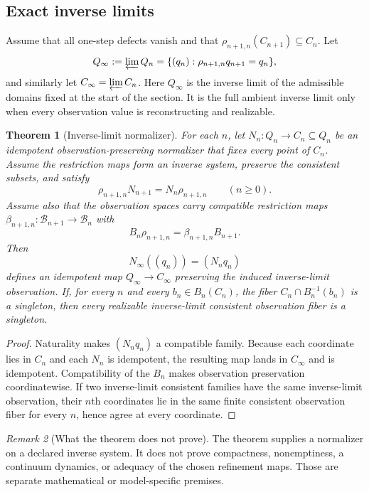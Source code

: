 \documentclass[11pt]{article}
\newtheorem{theorem}{Theorem}[section]
\theoremstyle{definition}
\theoremstyle{remark}
\newtheorem{remark}[theorem]{Remark}
\numberwithin{equation}{section}
\newcommand{\cB}{\mathcal B}
\begin{document}
\subsection{Exact inverse limits}

Assume that all one-step defects vanish and that
$\rho_{n+1,n}(C_{n+1})\subseteq C_n$.  Let
\[
 Q_\infty:=\varprojlim Q_n
 =\{(q_n):\rho_{n+1,n}q_{n+1}=q_n\},
\]
and similarly let $C_\infty=\varprojlim C_n$.
Here $Q_\infty$ is the inverse limit of the admissible domains fixed at the
start of the section.  It is the full ambient inverse limit only when every
observation value is reconstructing and realizable.

\begin{theorem}[Inverse-limit normalizer]\label{thm:inverse-limit}
For each $n$, let $N_n:Q_n\to C_n\subseteq Q_n$ be an idempotent
observation-preserving normalizer that fixes every point of $C_n$.  Assume the
restriction maps form an inverse system, preserve the consistent subsets, and
satisfy
\[
 \rho_{n+1,n}N_{n+1}=N_n\rho_{n+1,n}
 \qquad(n\ge0).
\]
Assume also that the observation spaces carry compatible restriction maps
$\beta_{n+1,n}:\cB_{n+1}\to\cB_n$ with
\[
 B_n\rho_{n+1,n}=\beta_{n+1,n}B_{n+1}.
\]
Then
\[
 N_\infty((q_n))=(N_nq_n)
\]
defines an idempotent map $Q_\infty\to C_\infty$ preserving the induced
inverse-limit observation.  If, for every $n$ and every
$b_n\in B_n(C_n)$, the fiber $C_n\cap B_n^{-1}(b_n)$ is a singleton, then
every realizable inverse-limit consistent observation fiber is a singleton.
\end{theorem}

\begin{proof}
Naturality makes $(N_nq_n)$ a compatible family.  Because each coordinate lies in $C_n$ and each $N_n$ is idempotent, the resulting map lands in $C_\infty$ and is idempotent.  Compatibility of the $B_n$ makes observation preservation coordinatewise.  If two inverse-limit consistent families have the same inverse-limit observation, their $n$th coordinates lie in the same finite consistent observation fiber for every $n$, hence agree at every coordinate.
\end{proof}

\begin{remark}[What the theorem does not prove]
The theorem supplies a normalizer on a declared inverse system.  It
does not prove compactness, nonemptiness, a continuum dynamics, or adequacy of
the chosen refinement maps.  Those are separate mathematical or
model-specific premises.
\end{remark}
\end{document}
